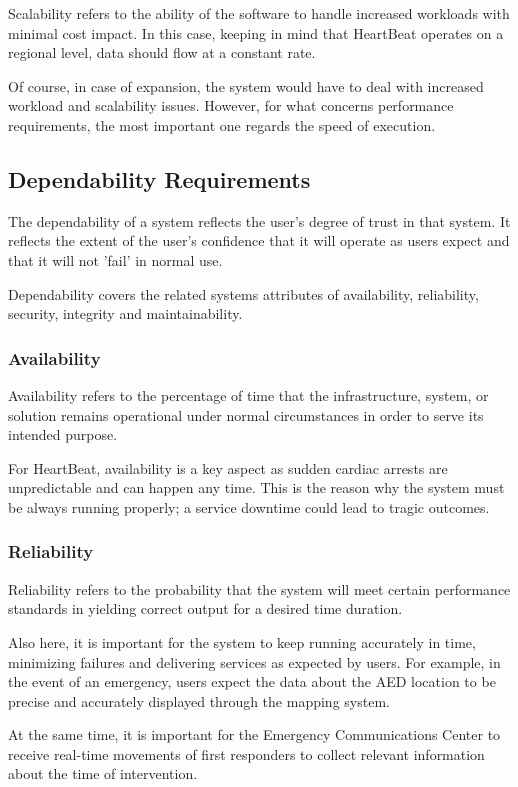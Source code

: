 \documentclass[11pt,a4paper]{article}
\begin{document}
Scalability refers to the ability of the software to handle increased workloads with minimal cost impact.
%
In this case, keeping in mind that HeartBeat operates on a regional level, data should flow at a constant rate.

Of course, in case of expansion, the system would have to deal with increased workload and scalability issues.
%
However, for what concerns performance requirements, the most important one regards the speed of execution.

\subsection{Dependability Requirements}
The dependability of a system reflects the user's degree of trust in that system. 
%
It reflects the extent of the user's confidence that it will operate as users expect and that it will not 'fail' in normal use. 

Dependability covers the related systems attributes of availability, reliability, security, integrity and maintainability.

\subsubsection{Availability}
Availability refers to the percentage of time that the infrastructure, system, or solution remains operational under normal circumstances in order to serve its intended purpose. 

For HeartBeat, availability is a key aspect as sudden cardiac arrests are unpredictable and can happen any time.
%
This is the reason why the system must be always running properly; a service downtime could lead to tragic outcomes.

\subsubsection{Reliability}
Reliability refers to the probability that the system will meet certain performance standards in yielding correct output for a desired time duration.

Also here, it is important for the system to keep running accurately in time, minimizing failures and delivering services as expected by users.
%
For example, in the event of an emergency, users expect the data about the AED location to be precise and accurately displayed through the mapping system.

At the same time, it is important for the Emergency Communications Center to receive real-time movements of first responders to collect relevant information about the time of intervention.
\end{document}
